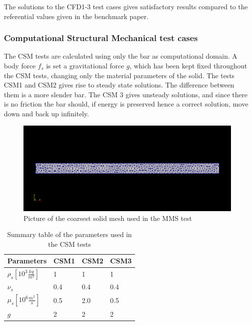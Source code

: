 The solutions to the CFD1-3 test cases gives satisfactory results compared to the referential values given in the benchmark paper.

\subsubsection{Computational Structural Mechanical test cases}
The CSM tests are calculated using only the bar as computational domain. A body force $f_s$ is set a gravitational force $g$, which has been kept fixed throughout the CSM tests, changing only the material parameters of the solid. The tests CSM1 and CSM2 gives rise to steady state solutions. The difference between them is a more slender bar. 
The CSM 3 gives unsteady solutions, and since there is no friction the bar should, if energy is preserved hence a correct solution, move down and back up infinitely. 

\begin{center}
\begin{figure}[H]
\caption{Picture of the coarsest solid mesh used in the MMS test}
\includegraphics[scale=0.50,trim={18mm 55mm 18mm 55mm},clip]{./Verification_Validation/Hron_Turek/structure.png}
\end{figure}
\end{center}

\vspace{0cm}

\begin{table}[H]
\centering
\caption{Summary table of the parameters used in the CSM tests}
\label{my-label}
\begin{tabular}{|l|l|l|l|}
\hline
Parameters & CSM1 & CSM2 & CSM3 \\ \hline
$\rho_s[10^3 \frac{kg}{m^3}]$ & 1 & 1 & 1 \\ \hline
$\nu_s$ & 0.4 & 0.4 & 0.4 \\ \hline
$\mu_s[10^6 \frac{m^2}{s}]$ & 0.5 & 2.0 & 0.5 \\ \hline
$g $ & 2 & 2 & 2 \\ \hline
\end{tabular}
\end{table}


